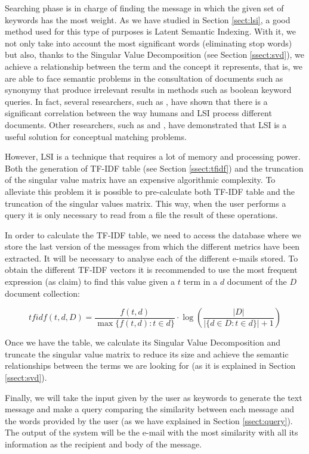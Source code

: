 Searching phase is in charge of finding the message in which the given set of keywords has the most weight. As we have studied in Section \ref{sect:lsi}, a good method used for this type of purposes is Latent Semantic Indexing. With it, we not only take into account the most significant words (eliminating stop words) but also, thanks to the Singular Value Decomposition (see Section \ref{ssect:svd}), we achieve a relationship between the term and the concept it represents, that is, we are able to face semantic problems in the consultation of documents such as synonymy that produce irrelevant results in methods such as boolean keyword queries. In fact, several researchers, such as \cite{landauer1998learning}, have shown that there is a significant correlation between the way humans and LSI process different documents. Other researchers, such as \cite{bartell1992latent} and \cite{ding1999similarity}, have demonstrated that LSI is a useful solution for conceptual matching problems.

However, LSI is a technique that requires a lot of memory and processing power. Both the generation of TF-IDF table (see Section \ref{ssect:tfidf}) and the truncation of the singular value matrix have an expensive algorithmic complexity. To alleviate this problem it is possible to pre-calculate both TF-IDF table and the truncation of the singular values matrix. This way, when the user performs a query it is only necessary to read from a file the result of these operations.

In order to calculate the TF-IDF table, we need to access the database where we store the last version of the messages from which the different metrics have been extracted. It will be necessary to analyse each of the different e-mails stored. To obtain the different TF-IDF vectors it is recommended to use the most frequent expression (as \cite{tang2014email} claim) to find this value given a $t$ term in a $d$ document of the $D$ document collection:

$$
tfidf(t,d,D) = \frac{f(t,d)}{\max\{ f(t,d):t\in d\}}\cdot\log\left(\frac{\lvert D\rvert}{\lvert \{ d\in D: t\in d\}\rvert+1}\right)
$$

Once we have the table, we calculate its Singular Value Decomposition and truncate the singular value matrix to reduce its size and achieve the semantic relationships between the terms we are looking for (as it is explained in Section \ref{ssect:svd}).

Finally, we will take the input given by the user as keywords to generate the text message and make a query comparing the similarity between each message and the words provided by the user (as we have explained in Section \ref{ssect:query}). The output of the system will be the e-mail with the most similarity with all its information as the recipient and body of the message.